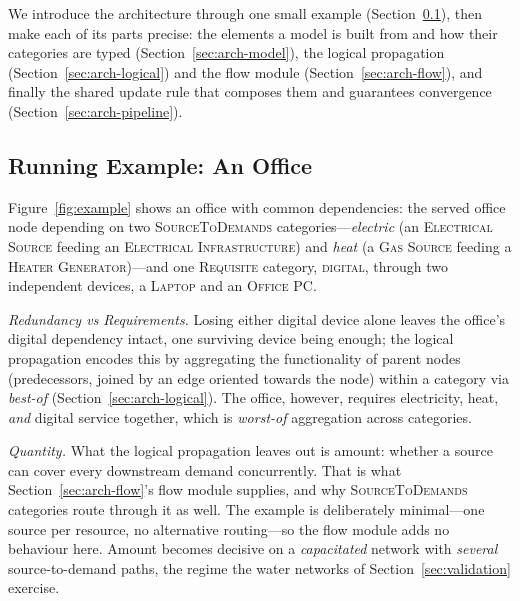 \documentclass{svproc}
\begin{document}
We introduce the architecture through one small example
(Section~\ref{sec:arch-example}), then make each of its parts precise: the elements a
model is built from and how their categories are typed
(Section~\ref{sec:arch-model}), the logical propagation (Section~\ref{sec:arch-logical}) and the flow module
(Section~\ref{sec:arch-flow}), and finally the shared update rule that composes them
and guarantees convergence (Section~\ref{sec:arch-pipeline}).

\subsection{Running Example: An Office}\label{sec:arch-example}

Figure~\ref{fig:example} shows an office with common dependencies: the served office node depending on two \textsc{SourceToDemands} categories---\emph{electric} (an \textsc{Electrical Source} feeding an
\textsc{Electrical Infrastructure}) and \emph{heat} (a \textsc{Gas Source} feeding
a \textsc{Heater Generator})---and one \textsc{Requisite} category, \textsc{digital},
through two independent devices, a \textsc{Laptop} and an \textsc{Office PC}.

\emph{Redundancy vs Requirements.} Losing either digital device alone leaves the
office's digital dependency intact, one surviving device being enough; the
logical propagation encodes this by aggregating the functionality of
parent nodes (predecessors, joined by an edge oriented towards the node) within a
category via \emph{best-of}
(Section~\ref{sec:arch-logical}). The office, however, requires electricity,
heat, \emph{and} digital service together, which is \emph{worst-of} aggregation
across categories.

\emph{Quantity.} What the logical propagation leaves out is amount: whether a
source can cover every downstream demand concurrently. That is what
Section~\ref{sec:arch-flow}'s flow module supplies, and why
\textsc{SourceToDemands} categories route through it as well. The example is
deliberately minimal---one source per resource, no alternative routing---so
the flow module adds no behaviour here. Amount becomes decisive on a
\emph{capacitated} network with \emph{several} source-to-demand paths, the regime
the water networks of Section~\ref{sec:validation} exercise.
\end{document}
